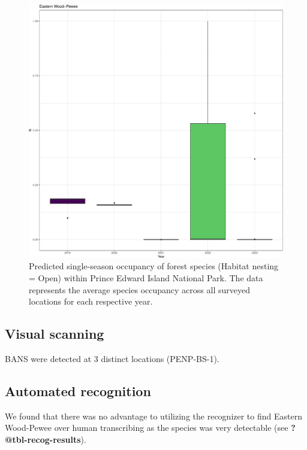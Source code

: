 \documentclass[
  letterpaper,
  DIV=11,
  numbers=noendperiod,
  oneside]{scrartcl}
\begin{document}
\begin{figure}

{\centering \includegraphics{peinp_files/figure-pdf/fig-spp-occ-open-1.pdf}

}

\caption{\label{fig-spp-occ-open}Predicted single-season occupancy of
forest species (Habitat nesting = Open) within Prince Edward Island
National Park. The data represents the average species occupancy across
all surveyed locations for each respective year.}

\end{figure}

\hypertarget{visual-scanning-1}{%
\subsection{Visual scanning}\label{visual-scanning-1}}

BANS were detected at 3 distinct locations (PENP-BS-1).

\hypertarget{automated-recognition-1}{%
\subsection{Automated recognition}\label{automated-recognition-1}}

We found that there was no advantage to utilizing the recognizer to find
Eastern Wood-Pewee over human transcribing as the species was very
detectable (see \textbf{?@tbl-recog-results}).
\end{document}
